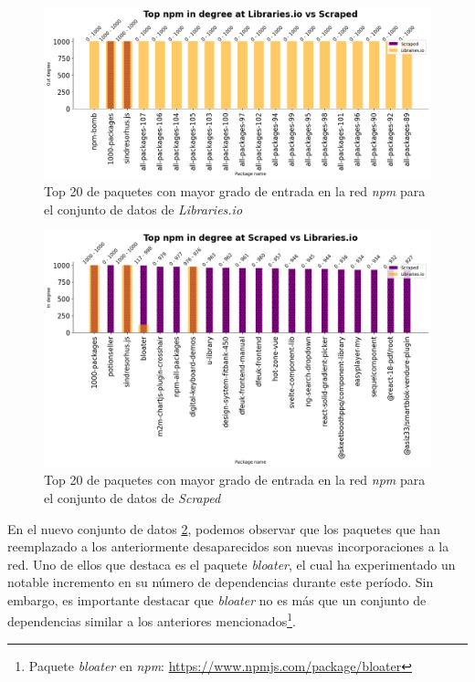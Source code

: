 \begin{figure}[ht!]
    \begin{center}
        \includegraphics[width=1\textwidth]{img/npm/ind_ls.png}
        \caption{Top 20 de paquetes con mayor grado de entrada en la red \textit{npm} para el conjunto de datos de \textit{Libraries.io}}
    \end{center}
    \label{fig:npm_ind_libraries}
\end{figure}

\begin{figure}[ht!]
    \begin{center}
        \includegraphics[width=1\textwidth]{img/npm/ind-sl.png}
        \caption{Top 20 de paquetes con mayor grado de entrada en la red \textit{npm} para el conjunto de datos de \textit{Scraped}}
    \end{center}
    \label{fig:npm_ind_scraped}
\end{figure}

En el nuevo conjunto de datos \ref{fig:npm_ind_scraped}, podemos observar que los paquetes que han reemplazado a los anteriormente desaparecidos
son nuevas incorporaciones a la red. Uno de ellos que destaca es el paquete \emph{bloater}, el cual ha experimentado
un notable incremento en su número de dependencias durante este período. Sin embargo, es importante destacar que \emph{bloater}
no es más que un conjunto de dependencias similar a los anteriores
mencionados\footnote{Paquete \emph{bloater} en \emph{npm}: \url{https://www.npmjs.com/package/bloater}}.

